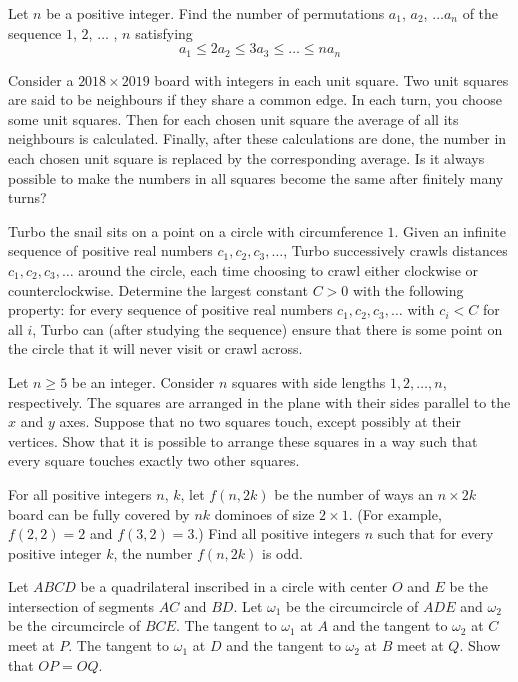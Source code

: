 \documentclass[11pt]{scrartcl}
\begin{document}
\begin{problem}[233559801569582]
Let $n$ be a positive integer. Find the number of permutations $a_1$, $a_2$, $\dots a_n$ of the
sequence $1$, $2$, $\dots$ , $n$ satisfying
$$a_1 \le 2a_2\le 3a_3 \le \dots \le na_n$$
\end{problem}
\begin{problem}[896559847059784]
	Consider a $2018 \times 2019$ board with integers in each unit square. Two unit squares are said to be neighbours if they share a common edge. In each turn, you choose some unit squares. Then for each chosen unit square the average of all its neighbours is calculated. Finally, after these calculations are done, the number in each chosen unit square is replaced by the corresponding average.
Is it always possible to make the numbers in all squares become the same after finitely many turns?
\end{problem}
\begin{problem}[194924255136905]
Turbo the snail sits on a point on a circle with circumference $1$. Given an infinite sequence of positive real numbers $c_1, c_2, c_3, \dots$, Turbo successively crawls distances $c_1, c_2, c_3, \dots$ around the circle, each time choosing to crawl either clockwise or counterclockwise.
Determine the largest constant $C > 0$ with the following property: for every sequence of positive real numbers $c_1, c_2, c_3, \dots$ with $c_i < C$ for all $i$, Turbo can (after studying the sequence) ensure that there is some point on the circle that it will never visit or crawl across.
\end{problem}
\begin{problem}[3951159057888736589]
Let $n \geq 5$ be an integer. Consider $n$ squares with side lengths $1, 2, \dots , n$, respectively. The squares are arranged in the plane with their sides parallel to the $x$ and $y$ axes. Suppose that no two squares touch, except possibly at their vertices. Show that it is possible to arrange these squares in a way such that every square touches exactly two other squares.
\end{problem}
\begin{problem}[5135909621527561588]
For all positive integers $n$, $k$, let $f(n, 2k)$ be the number of ways an $n \times 2k$ board can be fully covered by $nk$ dominoes of size $2 \times 1$. (For example, $f(2, 2)=2$ and $f(3, 2)=3$.) Find all positive integers $n$ such that for every positive integer $k$, the number $f(n, 2k)$ is odd.
\end{problem}
\begin{problem}[451078820354844]
	Let $ABCD$ be a quadrilateral inscribed in a circle with center $O$ and $E$ be the intersection of segments $AC$ and $BD$. Let $\omega_1$ be the circumcircle of $ADE$ and $\omega_2$ be the circumcircle of $BCE$. The tangent to $\omega_1$ at $A$ and the tangent to $\omega_2$ at $C$ meet at $P$. The tangent to $\omega_1$ at $D$ and the tangent to $\omega_2$ at $B$ meet at $Q$. Show that $OP=OQ$.
\end{problem}
\end{document}
